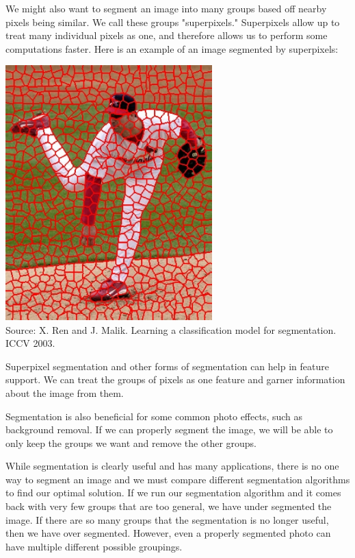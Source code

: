 \documentclass{article}
\begin{document}
We might also want to segment an image into many groups based off nearby pixels being similar. We call these groups "superpixels." Superpixels allow up to treat many individual pixels as one, and therefore allows us to perform some computations faster. Here is an example of an image segmented by superpixels:

\begin{center}
\includegraphics[width=8cm]{superpixels.png} \\
Source: X. Ren and J. Malik. Learning a classification model for segmentation. ICCV 2003.
\end{center}

Superpixel segmentation and other forms of segmentation can help in feature support. We can treat the groups of pixels as one feature and garner information about the image from them. 

Segmentation is also beneficial for some common photo effects, such as background removal. If we can properly segment the image, we will be able to only keep the groups we want and remove the other groups.

While segmentation is clearly useful and has many applications, there is no one way to segment an image and we must compare different segmentation algorithms to find our optimal solution. If we run our segmentation algorithm and it comes back with very few groups that are too general, we have under segmented the image. If there are so many groups that the segmentation is no longer useful, then we have over segmented. However, even a properly segmented photo can have multiple different possible groupings.
\end{document}
